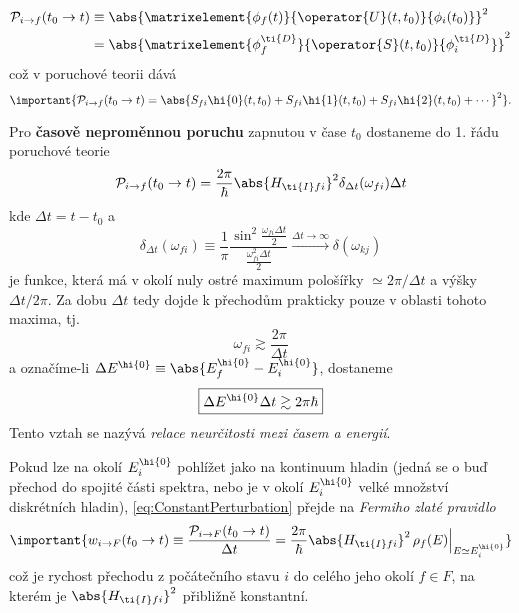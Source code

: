 \begin{align}
    \mathcal{P}_{i\rightarrow f}(t_{0}\rightarrow t)
        &\equiv\abs{\matrixelement{\phi_{f}(t)}{\operator{U}(t,t_{0})}{\phi_{i}(t_{0})}}^{2}\nonumber\\
        &=\abs{\matrixelement{\phi_{f}^{\ti{D}}}{\operator{S}(t,t_{0})}{\phi_{i}^{\ti{D}}}}^{2}
\end{align}
což v poruchové teorii dává
\begin{equation}
    \important{
        \mathcal{P}_{i\rightarrow f}(t_{0}\rightarrow t)
            =\abs{S_{fi}\hi{0}(t,t_{0})+S_{fi}\hi{1}(t,t_{0})
                +S_{fi}\hi{2}(t,t_{0})+\dotsb}^{2}
    }.
\end{equation}

Pro {\bf časově neproměnnou poruchu} zapnutou v čase $t_{0}$ dostaneme do 1. řádu 
poruchové teorie
\begin{equation}\label{eq:ConstantPerturbation}
    \mathcal{P}_{i\rightarrow f}(t_{0}\rightarrow t)
        =\frac{2\pi}{\hbar}\abs{H_{\ti{I}fi}}^{2}\delta_{\Delta t}(\omega_{fi})\Delta t
\end{equation}
kde $\Delta t=t-t_{0}$ a 
\begin{equation}
    \delta_{\Delta t}(\omega_{fi})
        \equiv\frac{1}{\pi}\frac{\sin^{2}
            \frac{\omega_{fi}\Delta t}{2}}{\frac{\omega^{2}_{fi}\Delta t}{2}}
        \xrightarrow{\Delta t\rightarrow\infty}\delta(\omega_{kj})
\end{equation}
je funkce, která má v okolí nuly ostré maximum pološířky $\simeq2\pi/\Delta t$ 
a výšky $\Delta t/2\pi$.
Za dobu $\Delta t$ tedy dojde k přechodům prakticky pouze v oblasti tohoto maxima, tj.
\begin{equation}
    \omega_{fi}
        \gtrsim\frac{2\pi}{\Delta t}
\end{equation}
a označíme-li $\Delta E^{\hi{0}}\equiv\abs{E^{\hi{0}}_{f}-E^{\hi{0}}_{i}}$, dostaneme
\begin{equation}
    \boxed{\Delta E^{\hi{0}}\Delta t
        \gtrsim2\pi\hbar}
\end{equation}
Tento vztah se nazývá \emph{relace neurčitosti mezi časem a energií}.

Pokud lze na okolí $E_{i}^{\hi{0}}$ pohlížet jako na kontinuum hladin (jedná se o buď přechod do spojité části spektra, nebo je v okolí $E_{i}^{\hi{0}}$ velké množství diskrétních hladin), \eqref{eq:ConstantPerturbation} 
přejde na \emph{Fermiho zlaté pravidlo}
\begin{equation}\label{eq:FermiGoldenRuleConst}
    \important{
        w_{i\rightarrow F}(t_{0}\rightarrow t)
            \equiv\frac{\mathcal{P}_{i\rightarrow F}(t_{0}\rightarrow t)}{\Delta t}
            =\frac{2\pi}{\hbar}\abs{H_{\ti{I}fi}}^{2}\,
                \rho_{f}(E)\Big\vert_{E\simeq E_{i}^{\hi{0}}}
    }
\end{equation}
což je rychost přechodu z počátečního stavu $i$ do celého jeho okolí $f\in F$, 
na kterém je $\abs{H_{\ti{I}fi}}^{2}$ přibližně konstantní.

